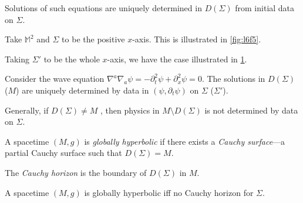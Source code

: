 Solutions of such equations are uniquely determined in $D(\Sigma)$  from initial data on $\Sigma$.
 \begin{example}[]
   Take $\mathbb{M}^2$  and $\Sigma$  to be the positive $x$-axis. This is illustrated in \ref{fig:l6f5}.
   \begin{figure}[tbhp]
     \centering
     \begin{minipage}[t]{0.5\columnwidth}
       \centering
       \def\svgwidth{0.8\columnwidth}
       
       \caption{}
       \label{fig:l6f5}
     \end{minipage}%
     \begin{minipage}[t]{0.5\columnwidth}
       \centering
       \def\svgwidth{0.8\columnwidth}
       
       \caption{}
       \label{fig:l6f6}
     \end{minipage}
   \end{figure}
   Taking $\Sigma'$ to be the whole $x$-axis, we have the case illustrated in \ref{fig:l6f6}.

  Consider the wave equation $\nabla^{a} \nabla_{a} \psi = -\partial_t^2 \psi + \partial_x^2 \psi = 0$.
  The solutions in $D(\Sigma)$ ($M$) are uniquely determined by data in $(\psi, \partial_t \psi)$ on $\Sigma$ ($\Sigma'$).
\end{example}

Generally, if $D(\Sigma) \neq M$ , then physics in $M \setminus D(\Sigma)$  is not determined by data on $\Sigma$.

 \begin{definition}[]
   A spacetime $(M, g)$ is \emph{globally hyperbolic} if there exists a \emph{Cauchy surface}---a partial Cauchy surface such that $D(\Sigma) = M$.
\end{definition}
\begin{definition}[]
  The \emph{Cauchy horizon} is the boundary of $D(\Sigma)$ in $M$.
\end{definition}

A spacetime $(M, g)$ is globally hyperbolic iff no Cauchy horizon for $\Sigma$.
